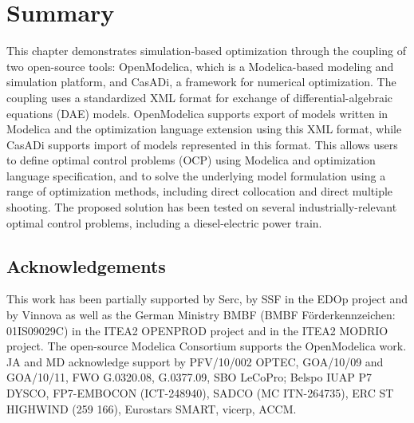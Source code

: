 \section{Summary}
\label{sec:optimizationsummary}

This chapter demonstrates simulation-based optimization through the coupling of two open-source tools: OpenModelica, which is a Modelica-based modeling and simulation platform, and CasADi, a framework for numerical optimization. The coupling uses a standardized XML format for exchange of
differential-algebraic equations (DAE) models. OpenModelica supports export of models written in Modelica and the optimization language extension using this XML format, while CasADi supports import of models represented in this format. This allows users to define optimal control problems (OCP) using
Modelica and optimization language specification, and to solve the underlying model formulation using a range of optimization methods, including direct collocation and direct multiple shooting. The proposed solution has been tested on several industrially-relevant optimal control problems, including a diesel-electric power train.

\subsection*{Acknowledgements}
\label{sec:optimizationacknowledgements}

This work has been partially supported by Serc, by SSF in the EDOp project and by Vinnova as well as the German
Ministry BMBF (BMBF F\"{o}rderkennzeichen: 01IS09029C) in the ITEA2 OPENPROD project and in the ITEA2 MODRIO
project. The open-source Modelica Consortium supports the OpenModelica work.
JA and MD acknowledge support by PFV/10/002 OPTEC, GOA/10/09 and GOA/10/11, FWO G.0320.08, G.0377.09,
SBO LeCoPro; Belspo IUAP P7 DYSCO, FP7-EMBOCON (ICT-248940), SADCO (MC ITN-264735),
ERC ST HIGHWIND (259 166), Eurostars SMART, vicerp, ACCM.






